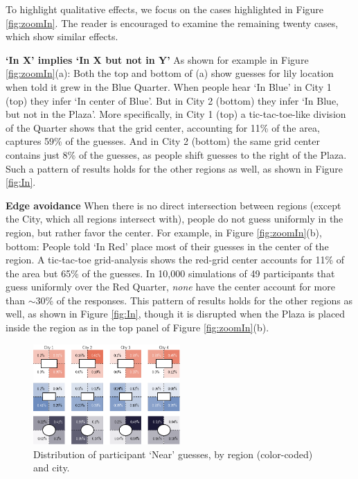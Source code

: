 \documentclass[10pt,letterpaper]{article}
\begin{document}
To highlight qualitative effects, we focus on the cases highlighted in Figure \ref{fig:zoomIn}. The reader is encouraged to examine the remaining twenty cases, which show similar effects. 

\textbf{`In X' implies `In X but not in Y'} As shown for example in Figure \ref{fig:zoomIn}(a): Both the top and bottom of (a) show guesses for lily location when told it grew in the Blue Quarter. When people hear `In Blue' in City 1 (top) they infer `In center of Blue'. But in City 2 (bottom) they infer `In Blue, but not in the Plaza'. More specifically, in City 1 (top) a tic-tac-toe-like division of the Quarter shows that the grid center, accounting for 11\% of the area, captures 59\% of the guesses. And in City 2 (bottom) the same grid center contains just 8\% of the guesses, as people shift guesses to the right of the Plaza. Such a pattern of results holds for the other regions as well, as shown in Figure \ref{fig:In}. 

\textbf{Edge avoidance} When there is no direct intersection between regions (except the City, which all regions intersect with), people do not guess uniformly in the region, but rather favor the center. For example, in Figure \ref{fig:zoomIn}(b), bottom: People told `In Red' place most of their guesses in the center of the region. A tic-tac-toe grid-analysis shows the red-grid center accounts for 11\% of the area but 65\% of the guesses. In 10,000 simulations of 49 participants that guess uniformly over the Red Quarter,  \textit{none} have the center account for more than $\sim$30\% of the responses. This pattern of results holds for the other regions as well, as shown in Figure \ref{fig:In}, though it is disrupted when the Plaza is placed inside the region as in the top panel of Figure \ref{fig:zoomIn}(b). 

\begin{figure}[!b]
\center
\includegraphics[width=0.5\textwidth]{figures/nearByQuad.png}
\caption{Distribution of participant `Near' guesses, by region (color-coded) and city.}
\label{fig:nearByQuad}
\end{figure}
\end{document}

